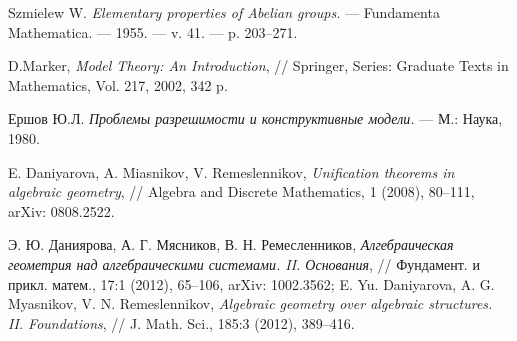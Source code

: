 \documentclass[a4paper,11pt,twoside]{article}
\def\note#1{\marginpar{\textcolor{red}{#1}}}
\begin{document}
\begin{thebibliography}{}

 Szmielew W. \textit{Elementary properties of Abelian groups.} — Fundamenta Mathematica. —
1955. — v. 41. — p. 203–271.

 D.Marker, \textit{Model Theory: An Introduction}, // Springer, Series: Graduate Texts in Mathematics, Vol. 217, 2002, 342 p.

 Ершов Ю.Л. \textit{Проблемы разрешимости и конструктивные модели.} --- М.: Наука, 1980.

 E. Daniyarova, A. Miasnikov, V. Remeslennikov, \textit{Unification theorems in algebraic geometry}, // Algebra and Discrete Mathematics, 1 (2008), 80--111, arXiv: 0808.2522.


 \note{Проверить ссылку} Э. Ю. Даниярова, А. Г. Мясников, В. Н. Ремесленников, \textit{Алгебраическая геометрия над алгебраическими системами. II. Основания}, // Фундамент. и прикл. матем., 17:1 (2012), 65--106, arXiv: 1002.3562; E. Yu. Daniyarova, A. G. Myasnikov, V. N. Remeslennikov, \textit{Algebraic geometry over algebraic structures. II. Foundations}, // J. Math. Sci., 185:3 (2012), 389--416.

\end{thebibliography}
\end{document}
